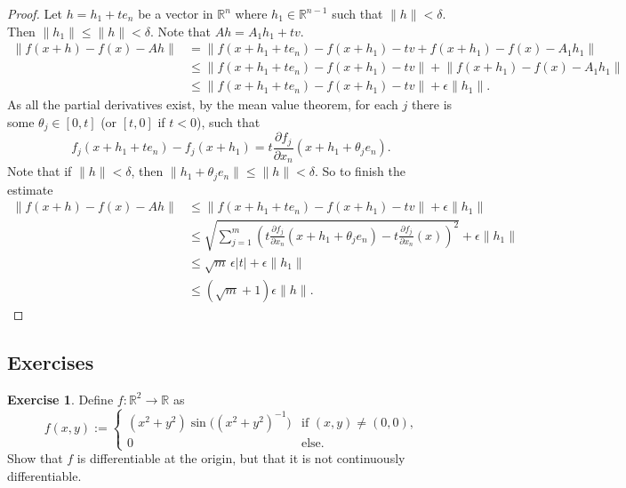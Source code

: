 \documentclass[12pt]{book}
\newcommand{\snorm}[1]{\lVert {#1} \rVert}
\newcommand{\abs}[1]{\left\lvert {#1} \right\rvert}
\newcommand{\R}{{\mathbb{R}}}
\theoremstyle{plain}
\theoremstyle{remark}
\theoremstyle{definition}
\theoremstyle{exercise}
\newtheorem{exercise}{Exercise}[section]
\theoremstyle{example}
\begin{document}
\begin{proof}
Let $h = h_1 + t e_n$ be a vector in $\R^n$ where $h_1 \in \R^{n-1}$ such that
$\snorm{h} < \delta$.  Then $\snorm{h_1} \leq \snorm{h} < \delta$.
Note that $Ah = A_1h_1 + tv$.
\begin{equation*}
\begin{split}
\snorm{f(x+h) - f(x) - Ah}
& = \snorm{f(x+h_1 + t e_n) - f(x+h_1) - tv + f(x+h_1) - f(x) - A_1h_1}
\\
& \leq \snorm{f(x+h_1 + t e_n) - f(x+h_1) -tv} + \snorm{f(x+h_1) - f(x) -
A_1h_1}
\\
& \leq \snorm{f(x+h_1 + t e_n) - f(x+h_1) -tv} + \epsilon \snorm{h_1} .
\end{split}
\end{equation*}
As all the partial derivatives exist, by the mean value theorem,
for each $j$ there is some $\theta_j \in [0,t]$ (or $[t,0]$ if $t < 0$), such that
\begin{equation*}
f_j(x+h_1 + t e_n) - f_j(x+h_1) =
t \frac{\partial f_j}{\partial x_n}(x+h_1+\theta_j e_n).
\end{equation*}
Note that if $\snorm{h} < \delta$, then $\snorm{h_1+\theta_j e_n} \leq \snorm{h}
< \delta$.
So to finish the estimate
\begin{equation*}
\begin{split}
\snorm{f(x+h) - f(x) - Ah}
& \leq \snorm{f(x+h_1 + t e_n) - f(x+h_1) -tv} + \epsilon \snorm{h_1}
\\
& \leq \sqrt{\sum_{j=1}^m {\left(t\frac{\partial f_j}{\partial
x_n}(x+h_1+\theta_j e_n) -
t \frac{\partial f_j}{\partial x_n}(x)\right)}^2} + \epsilon \snorm{h_1}
\\
& \leq \sqrt{m}\, \epsilon \abs{t} + \epsilon \snorm{h_1}
\\
& \leq (\sqrt{m}+1)\epsilon \snorm{h} .
\end{split}
\end{equation*}
\end{proof}

\subsection{Exercises}

\begin{exercise}
Define $f \colon \R^2 \to \R$ as
\begin{equation*}
f(x,y) :=
\begin{cases}
(x^2+y^2)\sin\bigl({(x^2+y^2)}^{-1}\bigr) & \text{if $(x,y)
\not= (0,0)$,} \\
0 & \text{else.}
\end{cases}
\end{equation*}
Show that $f$ is differentiable at the origin, but that it is not 
continuously differentiable.
\end{exercise}
\end{document}
